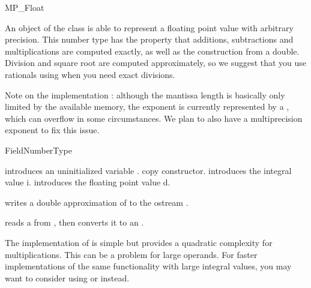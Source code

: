 
\begin{ccRefClass} {MP_Float}

\ccDefinition
An object of the class  is able to represent a floating point
value with arbitrary precision.  This number type has the property that
additions, subtractions and multiplications are computed exactly, as well as
the construction from a double.  Division and square root are computed
approximately, so we suggest that you use rationals using
 when you need exact divisions.

Note on the implementation : although the mantissa length is basically only
limited by the available memory, the exponent is currently represented by a
, which can overflow in some circumstances.  We plan to also have
a multiprecision exponent to fix this issue.


\ccIsModel
FieldNumberType

\ccCreation
{}

{introduces an uninitialized variable \ccVar.}
\ccGlue
{}
{copy constructor.}
\ccGlue
{}
{introduces the integral value i.}
\ccGlue
{}
{introduces the floating point value d.}

\ccOperations

{writes a double approximation of  to the ostream .}

{reads a  from , then converts it to an .}

\ccImplementation 
The implementation of  is simple but provides a quadratic
complexity for multiplications.  This can be a problem for large operands.
For faster implementations of the same functionality with large integral
values, you may want to consider using  or  instead.

\end{ccRefClass} 

